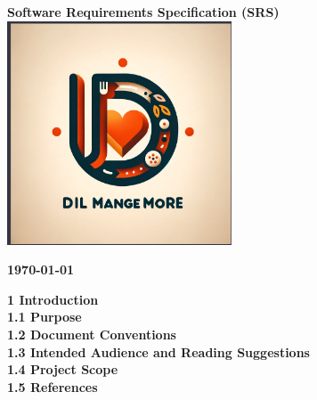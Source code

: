 \documentclass{article}
\begin{document}
\begin{titlepage}
    \centering
    \vspace*{1cm}
    {\Huge\bfseries Software Requirements Specification (SRS)\\[2cm]}
    \includegraphics[width=0.5\textwidth]{Logo.png} %
    \vspace{1cm}
    
    {\Large\bfseries \today\\}
\end{titlepage}



\newpage
\tableofcontents

\noindent
\textbf{1 Introduction} \\
\hspace*{10mm}\textbf{1.1 Purpose} \\
\hspace*{10mm}\textbf{1.2 Document Conventions} \\
\hspace*{10mm}\textbf{1.3 Intended Audience and Reading Suggestions} \\ 
\hspace*{10mm}\textbf{1.4 Project Scope} \\
\hspace*{10mm}\textbf{1.5 References} \\
\end{document}
